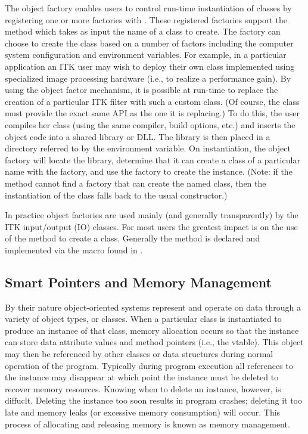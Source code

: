The object factory enables users to control run-time instantiation of classes
by registering one or more factories with . These
registered factories support the method 
which takes as input the name of a class to create. The factory can choose to
create the class based on a number of factors including the computer system
configuration and environment variables. For example, in a particular
application an ITK user may wish to deploy their own class implemented using
specialized image processing hardware (i.e., to realize a performance
gain). By using the object factor mechanism, it is possible at run-time to
replace the creation of a particular ITK filter with such a custom class. (Of
course, the class must provide the exact same API as the one it is
replacing.) To do this, the user compiles her class (using the same compiler,
build options, etc.) and inserts the object code into a shared library or
DLL. The library is then placed in a directory referred to by the
 environment variable. On instantiation, the object
factory will locate the library, determine that it can create a class of a
particular name with the factory, and use the factory to create the
instance. (Note: if the  method cannot find a factory
that can create the named class, then the instantiation of the class falls
back to the usual constructor.)

In practice object factories are used mainly (and generally transparently) by
the ITK input/output (IO) classes. For most users the greatest impact is on
the use of the  method to create a class. Generally the
 method is declared and implemented via the macro
 found in .


\subsection{Smart Pointers and Memory Management}
\label{sec:SmartPointers}

By their nature object-oriented systems represent and operate on data through
a variety of object types, or classes. When a particular class is
instantiated to produce an instance of that class, memory allocation occurs
so that the instance can store data attribute values and method pointers
(i.e., the vtable). This object may then be referenced by other classes or
data structures during normal operation of the program. Typically during
program execution all references to the instance may disappear at which point
the instance must be deleted to recover memory resources. Knowing when to
delete an instance, however, is diffuclt. Deleting the instance too soon
results in program crashes; deleting it too late and memory leaks (or
excessive memory consumption) will occur. This process of allocating and
releasing memory is known as memory management.

